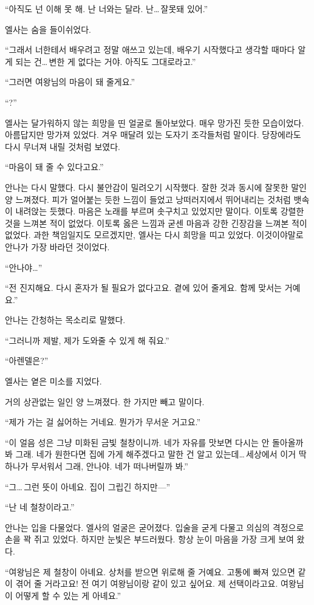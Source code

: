 ``아직도 넌 이해 못 해. 난 너와는 달라. 난\ldots\,잘못돼 있어.''

엘사는 숨을 들이쉬었다.

``그래서 너한테서 배우려고 정말 애쓰고 있는데, 배우기 시작했다고 생각할 때마다 알게 되는 건\ldots\,변한 게 없다는 거야. 아직도 그대로라고.''

``그러면 여왕님의 마음이 돼 줄게요.''

``?''

엘사는 달가워하지 않는 희망을 띤 얼굴로 돌아보았다. 매우 망가진 듯한 모습이었다. 아름답지만 망가져 있었다. 겨우 매달려 있는 도자기 조각들처럼 말이다. 당장에라도 다시 무너져 내릴 것처럼 보였다.

``마음이 돼 줄 수 있다고요.''

안나는 다시 말했다. 다시 불안감이 밀려오기 시작했다. 잘한 것과 동시에 잘못한 말인 양 느껴졌다. 피가 얼어붙는 듯한 느낌이 들었고 낭떠러지에서 뛰어내리는 것처럼 뱃속이 내려앉는 듯했다. 마음은 노래를 부르며 솟구치고 있었지만 말이다. 이토록 강렬한 것을 느껴본 적이 없었다. 이토록 옳은 느낌과 굳센 마음과 강한 긴장감을 느껴본 적이 없었다. 과한 책임일지도 모르겠지만, 엘사는 다시 희망을 띠고 있었다. 이것이야말로 안나가 가장 바라던 것이었다.

``안나야\ldots''

``전 진지해요. 다시 혼자가 될 필요가 없다고요. 곁에 있어 줄게요. 함께 맞서는 거예요.''

안나는 간청하는 목소리로 말했다.

``그러니까 제발, 제가 도와줄 수 있게 해 줘요.''

`` 아렌델은?''

엘사는 옅은 미소를 지었다.

거의 상관없는 일인 양 느껴졌다. 한 가지만 빼고 말이다.

``제가 가는 걸 싫어하는 거네요. 뭔가가 무서운 거고요.''

``이 얼음 성은 그냥 미화된 금빛 철창이니까. 네가 자유를 맛보면 다시는 안 돌아올까 봐 그래. 네가 원한다면 집에 가게 해주겠다고 말한 건 알고 있는데\ldots\,세상에서 이거 딱 하나가 무서워서 그래, 안나야. 네가 떠나버릴까 봐.''

``그\ldots\,그런 뜻이 아녜요. 집이 그립긴 하지만—''

``난 네 철창이라고.''

안나는 입을 다물었다. 엘사의 얼굴은 굳어졌다. 입술을 굳게 다물고 의심의 격정으로 손을 꽉 쥐고 있었다. 하지만 눈빛은 부드러웠다. 항상 눈이 마음을 가장 크게 보여 왔다.

``여왕님은 제 철창이 아녜요. 상처를 받으면 위로해 줄 거예요. 고통에 빠져 있으면 같이 겪어 줄 거라고요! 전 여기 여왕님이랑 같이 있고 싶어요. 제 선택이라고요. 여왕님이 어떻게 할 수 있는 게 아녜요.''

